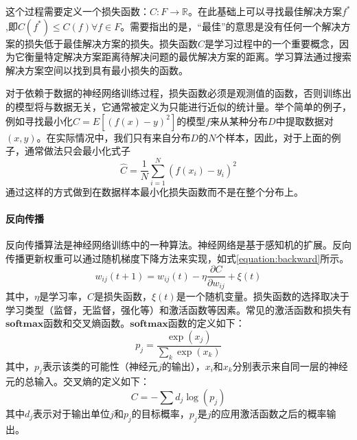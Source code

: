 这个过程需要定义一个损失函数：$C : F \rightarrow \mathbb{R}$。在此基础上可以寻找最佳解决方案$f^*$,即$C\left(f^{*}\right) \leq C(f) \forall f \in F$。需要指出的是，“最佳”的意思是没有任何一个解决方案的损失低于最佳解决方案的损失。损失函数$C$是学习过程中的一个重要概念，因为它衡量特定解决方案距离待解决问题的最优解决方案的距离。学习算法通过搜索解决方案空间以找到具有最小损失的函数。

对于依赖于数据的神经网络训练过程，损失函数必须是观测值的函数，否则训练出的模型将与数据无关，它通常被定义为只能进行近似的统计量。举个简单的例子，例如寻找最小化$C=E\left[(f(x)-y)^{2}\right]$的模型$f$来从某种分布$D$中提取数据对$(x,y)$。在实际情况中，我们只有来自分布$D$的$N$个样本，因此，对于上面的例子，通常做法只会最小化式子\begin{equation}\hat{C}=\frac{1}{N} \sum_{i=1}^{N}\left(f\left(x_{i}\right)-y_{i}\right)^{2}\end{equation}通过这样的方式做到在数据样本最小化损失函数而不是在整个分布上。

\paragraph{反向传播}\cite{ wiki:Artificial_neural_network}反向传播算法是神经网络训练中的一种算法。神经网络是基于感知机的扩展。反向传播更新权重可以通过随机梯度下降方法来实现，如式\ref{equation:backward}所示。
\begin{equation}
  \label{equation:backward}
  w_{i j}(t+1)=w_{i j}(t)-\eta \frac{\partial C}{\partial w_{i j}}+\xi(t)
\end{equation}
其中，$\eta$是学习率，$C$是损失函数，$\xi(t)$是一个随机变量。损失函数的选择取决于学习类型（监督，无监督，强化等）和激活函数等因素。常见的激活函数和损失有$\mathbf{softmax}$函数和交叉熵函数。$\mathbf{softmax}$函数的定义如下：
\begin{equation}
  p_{j}=\frac{\exp \left(x_{j}\right)}{\sum_{k} \exp \left(x_{k}\right)}
\end{equation}其中，$p_j$表示该类的可能性（神经元$j$的输出），$x_i$和$x_k$分别表示来自同一层的神经元的总输入。交叉熵的定义如下：
\begin{equation}
  C=-\sum d_{j} \log \left(p_{j}\right)
\end{equation}
其中$d_{j}$表示对于输出单位$j$和$p_{j}$的目标概率，$p_{j}$是$j$的应用激活函数之后的概率输出。


